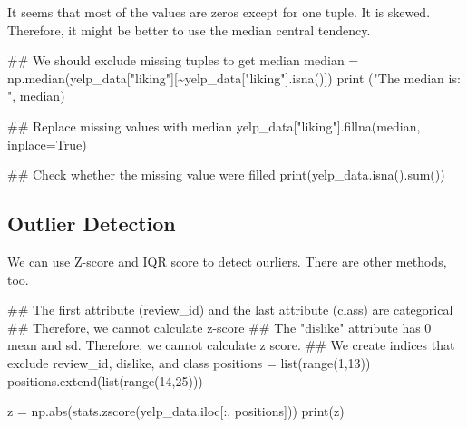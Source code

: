 \documentclass[
  letterpaper,
]{scrbook}
\newenvironment{Shaded}{\begin{snugshade}}{\end{snugshade}}
\newcommand{\BuiltInTok}[1]{\textcolor[rgb]{0.00,0.23,0.31}{#1}}
\newcommand{\CommentTok}[1]{\textcolor[rgb]{0.37,0.37,0.37}{#1}}
\newcommand{\DecValTok}[1]{\textcolor[rgb]{0.68,0.00,0.00}{#1}}
\newcommand{\NormalTok}[1]{\textcolor[rgb]{0.00,0.23,0.31}{#1}}
\newcommand{\OperatorTok}[1]{\textcolor[rgb]{0.37,0.37,0.37}{#1}}
\newcommand{\StringTok}[1]{\textcolor[rgb]{0.13,0.47,0.30}{#1}}
\newcommand{\VariableTok}[1]{\textcolor[rgb]{0.07,0.07,0.07}{#1}}
\begin{document}
It seems that most of the values are zeros except for one tuple. It is
skewed. Therefore, it might be better to use the median central
tendency.

\begin{Shaded}
\begin{Highlighting}[]
\CommentTok{\#\# We should exclude missing tuples to get median}
\NormalTok{median }\OperatorTok{=}\NormalTok{ np.median(yelp\_data[}\StringTok{"liking"}\NormalTok{][}\OperatorTok{\textasciitilde{}}\NormalTok{yelp\_data[}\StringTok{"liking"}\NormalTok{].isna()])}
\BuiltInTok{print}\NormalTok{ (}\StringTok{"The median is: "}\NormalTok{, median)}

\CommentTok{\#\# Replace missing values with median }
\NormalTok{yelp\_data[}\StringTok{"liking"}\NormalTok{].fillna(median, inplace}\OperatorTok{=}\VariableTok{True}\NormalTok{)}

\CommentTok{\#\# Check whether the missing value were filled}
\BuiltInTok{print}\NormalTok{(yelp\_data.isna().}\BuiltInTok{sum}\NormalTok{())}
\end{Highlighting}
\end{Shaded}

\subsection*{Outlier Detection}\label{outlier-detection}

We can use Z-score and IQR score to detect ourliers. There are other
methods, too.

\begin{Shaded}
\begin{Highlighting}[]
\CommentTok{\#\# The first attribute (review\_id) and the last attribute (class) are categorical}
\CommentTok{\#\# Therefore, we cannot calculate z{-}score }
\CommentTok{\#\# The "dislike" attribute has 0 mean and sd. Therefore, we cannot calculate z score.}
\CommentTok{\#\# We create indices that exclude review\_id, dislike, and class}
\NormalTok{positions }\OperatorTok{=} \BuiltInTok{list}\NormalTok{(}\BuiltInTok{range}\NormalTok{(}\DecValTok{1}\NormalTok{,}\DecValTok{13}\NormalTok{))}
\NormalTok{positions.extend(}\BuiltInTok{list}\NormalTok{(}\BuiltInTok{range}\NormalTok{(}\DecValTok{14}\NormalTok{,}\DecValTok{25}\NormalTok{)))}

\NormalTok{z }\OperatorTok{=}\NormalTok{ np.}\BuiltInTok{abs}\NormalTok{(stats.zscore(yelp\_data.iloc[:, positions]))}
\BuiltInTok{print}\NormalTok{(z)}
\end{Highlighting}
\end{Shaded}
\end{document}
